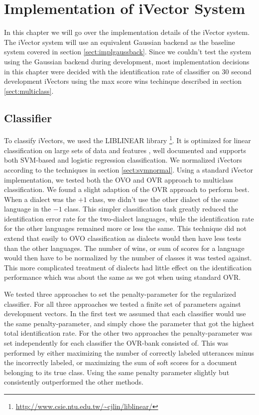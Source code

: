 \chapter{Implementation of iVector System}

In this chapter we will go over the implementation details of the iVector system. The iVector system will use an equivalent Gaussian backend as the baseline system covered in section \ref{sect:implgaussback}. Since we couldn't test the system using the Gaussian backend during development, most implementation decisions in this chapter were decided with the identification rate of classifier on 30 second development iVectors using the max score wins techinque described in section \ref{sect:multiclass}.

\section{Classifier}

To classify iVectors, we used the LIBLINEAR library \footnote{\url{http://www.csie.ntu.edu.tw/~cjlin/liblinear/}}. It is optimized for linear classification on large sets of data and features \cite{liblinear}, well documented and supports both SVM-based and logistic regression classification. We normalized iVectors according to the techniques in section \ref{sect:svmnormal}. Using a standard iVector implementation, we tested both the OVO and OVR approach to multiclass classification. We found a slight adaption of the OVR approach to perform best. When a dialect was the $+1$ class, we didn't use the other dialect of the same language in the $-1$ class. This simpler classification task greatly reduced the identification error rate for the two-dialect languages, while the identification rate for the other languages remained more or less the same. This technique did not extend that easily to OVO classification as dialects would then have less tests than the other languages. The number of wins, or sum of scores for a language would then have to be normalized by the number of classes it was tested against. This more complicated treatment of dialects had little effect on the identification performance which was about the same as we got when using standard OVR. 

We tested three approaches to set the penalty-parameter for the regularized classifier. For all three approaches we tested a finite set of parameters against development vectors. In the first test we assumed that each classifier would use the same penalty-parameter, and simply chose the parameter that got the highest total identification rate. For the other two approaches the penalty-parameter was set independently for each classifier the OVR-bank consisted of. This was performed by either maximizing the number of correctly labeled utterances minus the incorrectly labeled, or maximizing the sum of soft scores for a document belonging to its true class. Using the same penalty parameter slightly but consistently outperformed the other methods. 

